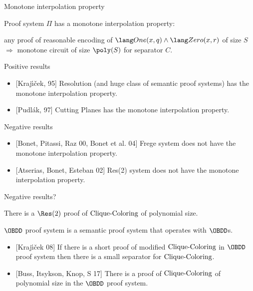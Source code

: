 \begin{frame}{Monotone interpolation property}

    Proof system $\Pi$ has a monotone interpolation property:
    
    any proof of reasonable encoding of $\One(x, q) \land \Zero(x, r)$ of size $S$ $\Rightarrow$ monotone circuit
    of size $\poly(S)$ for separator $C$.

    \pause
    \begin{block}{Positive results}
        \begin{itemize}
            \item {[Kraj{\'{\i}}{\v{c}}ek, 95]} Resolution (and huge class of semantic proof systems) has
                the monotone interpolation property.
            \item {[Pudl{\'{a}}k, 97]} Cutting Planes has the monotone interpolation property.
        \end{itemize}
    \end{block}

    \pause
    \begin{block}{Negative results}
        \begin{itemize}
            \item {[Bonet, Pitassi, Raz 00, Bonet et al. 04]} Frege system does not have the monotone
                interpolation property.
            \item {[Atserias, Bonet, Esteban 02]} Res(2) system does not have the monotone interpolation 
                property.
        \end{itemize}
    \end{block}
    
\end{frame}

\begin{frame}{Negative results?}

    \begin{theorem}
        There is a $\Res(2)$ proof of $\mathrm{Clique}\text{-}\mathrm{Coloring}$ of polynomial size.
    \end{theorem}

    \pause
    $\OBDD$ proof system is a semantic proof system that operates with $\OBDD$s.

    \begin{itemize}
        \item {[Kraj{\'{\i}}{\v{c}}ek 08]} If there is a short proof of {\color{blue} modified}
            $\mathrm{Clique}\text{-}\mathrm{Coloring}$ in $\OBDD$ proof system then there is a small separator for
            $\mathrm{Clique}\text{-}\mathrm{Coloring}$.
        \item {[Buss, Itsykson, Knop, S 17]} There is a proof of $\mathrm{Clique}\text{-}\mathrm{Coloring}$ of polynomial size in
            the $\OBDD$ proof system.
    \end{itemize}
\end{frame}

